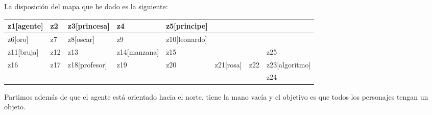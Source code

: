 \documentclass[12pt,a4paper]{article}
\begin{document}
La disposición del mapa que he dado es la siguiente:

\begin{table}[H]
	\begin{tabular}{|l|l|l|l|l|l|l|l|}
		\hline
		z1{[}agente{]} & z2  & z3{[}princesa{]}  & z4               & z5{[}principe{]}  &               &     &                    \\ \hline
		z6{[}oro{]}    & z7  & z8{[}oscar{]}     & z9               & z10{[}leonardo{]} &               &     &                    \\ \hline
		z11{[}bruja{]} & z12 & z13               & z14{[}manzana{]} & z15               &               &     & z25                \\ \hline
		z16            & z17 & z18{[}profesor{]} & z19              & z20               & z21{[}rosa{]} & z22 & z23{[}algoritmo{]} \\ \hline
		&     &                   &                  &                   &               &     & z24                \\ \hline
	\end{tabular}
\end{table}

Partimos además de que el agente está orientado hacia el norte, tiene la mano vacía y el objetivo es que todos los personajes tengan un objeto.
\end{document}
